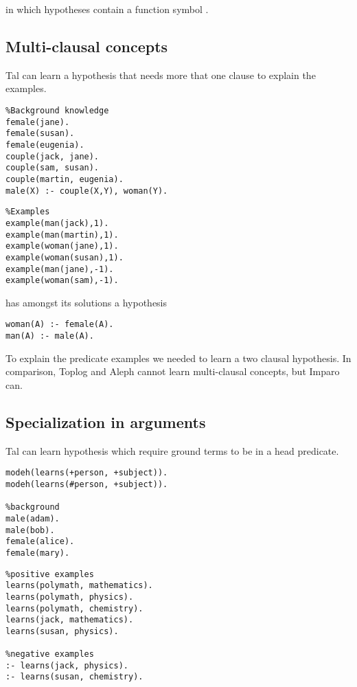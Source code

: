 in which hypotheses contain a function symbol .

\subsection{Multi-clausal concepts}
Tal can learn a hypothesis that needs more that one clause to explain the examples.

\begin{minipage}[t]{.50\textwidth}
\begin{lstlisting}
%Background knowledge
female(jane).
female(susan).
female(eugenia).
couple(jack, jane).
couple(sam, susan).
couple(martin, eugenia).
male(X) :- couple(X,Y), woman(Y).
\end{lstlisting}
\end{minipage}
\begin{minipage}[t]{.20\textwidth}
\begin{lstlisting}
%Examples
example(man(jack),1).
example(man(martin),1).
example(woman(jane),1).
example(woman(susan),1).
example(man(jane),-1).
example(woman(sam),-1).
\end{lstlisting}
\end{minipage}

has amongst its solutions a hypothesis
\begin{lstlisting}
woman(A) :- female(A).
man(A) :- male(A).
\end{lstlisting}
To explain the  predicate examples we needed to learn a two clausal hypothesis. In comparison, Toplog and Aleph cannot learn multi-clausal concepts, but Imparo can.

\subsection{Specialization in arguments}
Tal can learn hypothesis which require ground terms to be in a head predicate.

\begin{minipage}[t]{.50\textwidth}
\begin{lstlisting}
modeh(learns(+person, +subject)).
modeh(learns(#person, +subject)).

%background
male(adam).
male(bob).
female(alice).
female(mary).
\end{lstlisting}
\end{minipage}
\begin{minipage}[t]{.20\textwidth}
\begin{lstlisting}
%positive examples
learns(polymath, mathematics).
learns(polymath, physics).
learns(polymath, chemistry).
learns(jack, mathematics).
learns(susan, physics).

%negative examples
:- learns(jack, physics).
:- learns(susan, chemistry).
\end{lstlisting}
\end{minipage}

